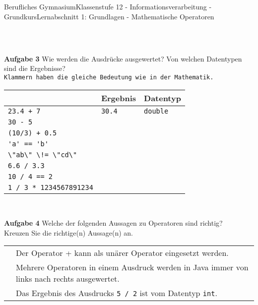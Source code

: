 \documentclass[oneside,openany,headings=optiontotoc,11pt,numbers=noenddot]{scrreprt}
\begin{document}
\begin{worksheet}{Berufliches Gymnasium}{Klassenstufe 12 - Informationsverarbeitung - Grundkurs}{Lernabschnitt 1: Grundlagen - Mathematische Operatoren}
\begin{framed}
\begin{minipage}{0.7\textwidth}
\begin{tabularx}{0.9\textwidth}{cl}
				\end{tabularx}
			\end{minipage}\\
			\par\noindent
			\textbf{Aufgabe 3} Wie werden die Ausdrücke ausgewertet? Von welchen Datentypen sind die Ergebnisse?\\
			\texttt{Klammern haben die gleiche Bedeutung wie in der Mathematik.}\\
			\par\noindent
			\begin{tabularx}{\textwidth}{|l|X|X|}
				\hline
				& \textbf{Ergebnis} & \textbf{Datentyp}\\
				\hline
				\hline
				{\lstinline[style=JavaInputStyle]|23.4 + 7|} & {\lstinline[style=JavaInputStyle]|30.4|} & {\lstinline[style=JavaInputStyle]|double|}\\
				\hline
				{\lstinline[style=JavaInputStyle]|30 - 5|} & & \\
				\hline
				{\lstinline[style=JavaInputStyle]|(10/3) + 0.5|} & & \\
				\hline
				{\lstinline[style=JavaInputStyle]|'a' == 'b'|} & & \\
				\hline
				{\lstinline[style=JavaInputStyle]|\"ab\" \!= \"cd\"|} & & \\
				\hline
				{\lstinline[style=JavaInputStyle]|6.6 / 3.3|} & & \\
				\hline
				{\lstinline[style=JavaInputStyle]|10 / 4 == 2|} & & \\
				\hline
				{\lstinline[style=JavaInputStyle]|1 / 3 * 1234567891234|} & & \\
				\hline
			\end{tabularx}\\
			\par\noindent
			\textbf{Aufgabe 4} Welche der folgenden Aussagen zu Operatoren sind richtig?\\
			Kreuzen Sie die richtige(n) Aussage(n) an.\\
			\par\noindent
			\begin{tabularx}{0.9\textwidth}{cl}
				\fbox{} & Der Operator + kann als unärer Operator eingesetzt werden.\\
				\fbox{} & Mehrere Operatoren in einem Ausdruck werden in Java immer von links nach rechts ausgewertet.\\
				\fbox{} & Das Ergebnis des Ausdrucks {\lstinline[style=JavaInputStyle]|5 / 2|} ist vom Datentyp {\lstinline[style=JavaInputStyle]|int|}.\\

\end{tabularx}
\end{framed}
\end{worksheet}
\end{document}
